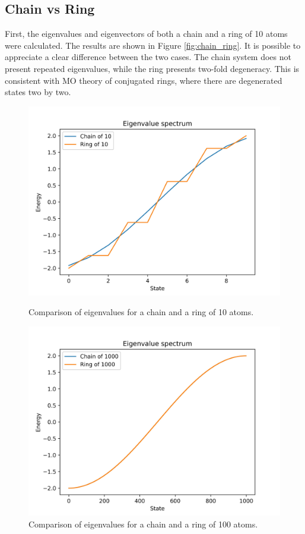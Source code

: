 \documentclass{article}
\begin{document}
\subsection{Chain vs Ring}
First, the eigenvalues and eigenvectors of both a chain and a ring of 10 atoms were calculated. The results are shown in Figure \ref{fig:chain_ring}. It is possible to appreciate a clear difference between the two cases. The chain system does not present repeated eigenvalues, while the ring presents two-fold degeneracy. This is consistent with MO theory of conjugated rings, where there are degenerated states two by two. 

\begin{figure}[h]
    \centering
    \begin{minipage}{0.47\textwidth}
        \centering
        \includegraphics[width=\textwidth]{Figures/chain_vs_ring.jpg}
        \caption{Comparison of eigenvalues for a chain and a ring of 10 atoms.}
        \label{fig:chain_ring}
    \end{minipage}
    \hfill
    \begin{minipage}{0.47\textwidth}
        \centering
        \includegraphics[width=\textwidth]{Figures/convergence_limit.jpg}
        \caption{Comparison of eigenvalues for a chain and a ring of 100 atoms.}
        \label{fig:chain_vs_ring_infinite}
    \end{minipage}
\end{figure}
\end{document}
